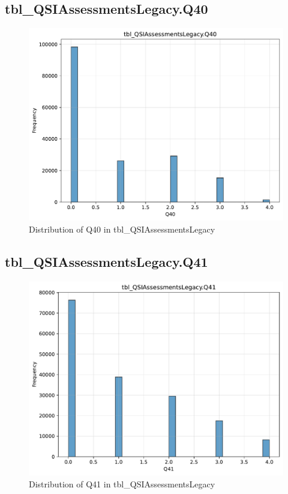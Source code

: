 \subsection{tbl\_QSIAssessmentsLegacy.Q40}

\begin{figure}[htbp]
\centering
\includegraphics[width=\textwidth]{figures/dbo_tbl_QSIAssessmentsLegacy_Q40.pdf}
\caption{Distribution of Q40 in tbl\_QSIAssessmentsLegacy}
\end{figure}\newpage

\subsection{tbl\_QSIAssessmentsLegacy.Q41}

\begin{figure}[htbp]
\centering
\includegraphics[width=\textwidth]{figures/dbo_tbl_QSIAssessmentsLegacy_Q41.pdf}
\caption{Distribution of Q41 in tbl\_QSIAssessmentsLegacy}
\end{figure}\newpage

